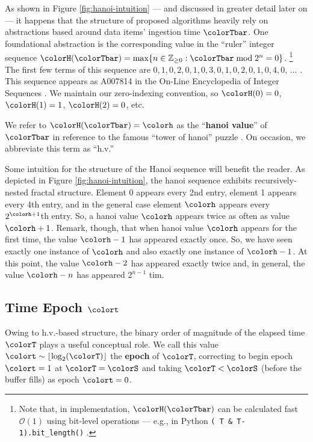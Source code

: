 

As shown in Figure \ref{fig:hanoi-intuition} --- and discussed in greater detail later on --- it happens that the structure of proposed algorithms heavily rely on abstractions based around data items' ingestion time $\colorTbar$.
One foundational abstraction is the corresponding value in the ``ruler'' integer sequence $\colorH(\colorTbar) = \max \{ n \in \mathbb{Z}_{\geq0} : \colorTbar \bmod 2^n = 0 \}$.%
\footnote{%
Note that, in implementation, $\colorH(\colorTbar)$ can be calculated fast $\mathcal{O}(1)$ using bit-level operations --- e.g., in Python \texttt{(~T \& T-1).bit\_length()} \citep{oeis}.
}
The first few terms of this sequence are $0,\allowbreak 1,\allowbreak 0,\allowbreak 2,\allowbreak 0,\allowbreak 1,\allowbreak 0,\allowbreak 3,\allowbreak 0,\allowbreak 1,\allowbreak 0,\allowbreak 2,\allowbreak 0,\allowbreak 1,\allowbreak 0,\allowbreak 4,\allowbreak 0,\allowbreak \,\ldots$ \quad .
This sequence appears as A007814 in the On-Line Encyclopedia of Integer Sequences \citep{oeis}.
We maintain our zero-indexing convention, so $\colorH(0) = 0$, $\colorH(1) = 1$, $\colorH(2) = 0$, etc.

We refer to $\colorH(\colorTbar) = \colorh$ as the ``\textbf{hanoi value}'' of $\colorTbar$ in reference to the famous ``tower of hanoi'' puzzle \citep{lucas1889jeux}.
On occasion, we abbreviate this term as ``h.v.''

Some intuition for the structure of the Hanoi sequence will benefit the reader.
As depicted in Figure \ref{fig:hanoi-intuition}, the hanoi sequence exhibits recursively-nested fractal structure.
Element 0 appears every 2nd entry, element 1 appears every 4th entry, and in the general case element $\colorh$ appears every $2^{\colorh+1}$th entry.
So, a hanoi value $\colorh$ appears twice as often as value $\colorh + 1$.
Remark, though, that when hanoi value $\colorh$ appears for the first time, the value $\colorh - 1$ has appeared exactly once.
So, we have seen exactly one instance of $\colorh$ and also exactly one instance of $\colorh - 1$.
At this point, the value $\colorh - 2$ has appeared exactly twice and, in general, the value $\colorh - n$ has appeared $2^{n - 1}$ tim.

\subsection{Time Epoch $\colort$}
\label{sec:notation-epoch}

Owing to h.v.-based structure, the binary order of magnitude of the elapsed time $\colorT$ plays a useful conceptual role.
We call this value $\colort \sim \left\lfloor \log_2(\colorT) \right\rfloor$ the \textbf{epoch} of $\colorT$, correcting to begin epoch $\colort=1$ at $\colorT = \colorS$ and taking $\colorT < \colorS$ (before the buffer fills) as epoch $\colort=0$.

